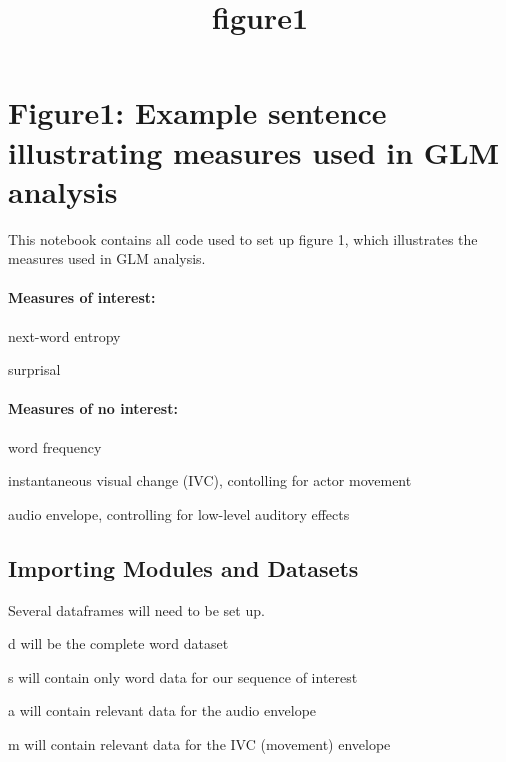 \documentclass[11pt]{article}
\title{figure1}
\begin{document}
    
    \maketitle
    
    

    
    \hypertarget{figure1-example-sentence-illustrating-measures-used-in-glm-analysis}{%
\section{Figure1: Example sentence illustrating measures used in GLM
analysis}\label{figure1-example-sentence-illustrating-measures-used-in-glm-analysis}}

This notebook contains all code used to set up figure 1, which
illustrates the measures used in GLM analysis.

\hypertarget{measures-of-interest}{%
\paragraph{Measures of interest:}\label{measures-of-interest}}

next-word entropy

surprisal

\hypertarget{measures-of-no-interest}{%
\paragraph{Measures of no interest:}\label{measures-of-no-interest}}

word frequency

instantaneous visual change (IVC), contolling for actor movement

audio envelope, controlling for low-level auditory effects

    \hypertarget{importing-modules-and-datasets}{%
\subsection{Importing Modules and
Datasets}\label{importing-modules-and-datasets}}

Several dataframes will need to be set up.

d will be the complete word dataset

s will contain only word data for our sequence of interest

a will contain relevant data for the audio envelope

m will contain relevant data for the IVC (movement) envelope
\end{document}
